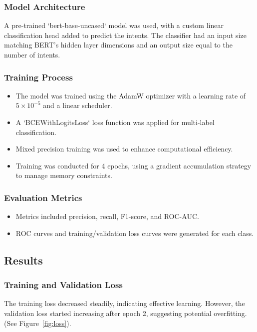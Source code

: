\subsubsection*{Model Architecture}
A pre-trained `bert-base-uncased` model was used, with a custom linear classification head added to predict the intents. The classifier had an input size matching BERT's hidden layer dimensions and an output size equal to the number of intents.

\subsubsection*{Training Process}
\begin{itemize}
    \item The model was trained using the AdamW optimizer with a learning rate of $5 \times 10^{-5}$ and a linear scheduler.
    \item A `BCEWithLogitsLoss` loss function was applied for multi-label classification.
    \item Mixed precision training was used to enhance computational efficiency.
    \item Training was conducted for 4 epochs, using a gradient accumulation strategy to manage memory constraints.
\end{itemize}

\subsubsection*{Evaluation Metrics}
\begin{itemize}
    \item Metrics included precision, recall, F1-score, and ROC-AUC.
    \item ROC curves and training/validation loss curves were generated for each class.
\end{itemize}

\subsection*{Results}

\subsubsection*{Training and Validation Loss}
The training loss decreased steadily, indicating effective learning. However, the validation loss started increasing after epoch 2, suggesting potential overfitting. (See Figure~\ref{fig:loss}).

